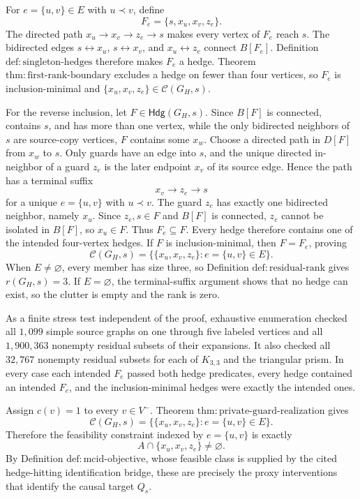 For \(e=\{u,v\}\in E\) with \(u\prec v\), define
\[
 F_e=\{s,x_u,x_v,z_e\}.
\]
The directed path \(x_u\to x_v\to z_e\to s\) makes every vertex of
\(F_e\) reach \(s\).  The bidirected edges
\(s\leftrightarrow x_u\), \(s\leftrightarrow x_v\), and
\(x_u\leftrightarrow z_e\) connect \(B[F_e]\).  Definition
\(\mathrm{def{:}singleton\mbox{-}hedges}\) therefore makes \(F_e\) a
hedge.  Theorem \(\mathrm{thm{:}first\mbox{-}rank\mbox{-}boundary}\)
excludes a hedge on fewer than four vertices, so \(F_e\) is
inclusion-minimal and
\(\{x_u,x_v,z_e\}\in\mathcal C(G_H,s)\).

For the reverse inclusion, let \(F\in\mathsf{Hdg}(G_H,s)\).  Since
\(B[F]\) is connected, contains \(s\), and has more than one vertex, while
the only bidirected neighbors of \(s\) are source-copy vertices, \(F\)
contains some \(x_w\).  Choose a directed path in \(D[F]\) from \(x_w\)
to \(s\).  Only guards have an edge into \(s\), and the unique directed
in-neighbor of a guard \(z_e\) is the later endpoint \(x_v\) of its source
edge.  Hence the path has a terminal suffix
\[
 x_v\longrightarrow z_e\longrightarrow s
\]
for a unique \(e=\{u,v\}\) with \(u\prec v\).  The guard \(z_e\) has
exactly one bidirected neighbor, namely \(x_u\).  Since \(z_e,s\in F\)
and \(B[F]\) is connected, \(z_e\) cannot be isolated in \(B[F]\), so
\(x_u\in F\).  Thus \(F_e\subseteq F\).  Every hedge therefore contains
one of the intended four-vertex hedges.  If \(F\) is inclusion-minimal,
then \(F=F_e\), proving
\[
 \mathcal C(G_H,s)
 =\bigl\{\{x_u,x_v,z_e\}:e=\{u,v\}\in E\bigr\}.
\]
When \(E\neq\varnothing\), every member has size three, so Definition
\(\mathrm{def{:}residual\mbox{-}rank}\) gives \(r(G_H,s)=3\).  If
\(E=\varnothing\), the terminal-suffix argument shows that no hedge can
exist, so the clutter is empty and the rank is zero.

As a finite stress test independent of the proof, exhaustive enumeration
checked all \(1{,}099\) simple source graphs on one through five labeled
vertices and all \(1{,}900{,}363\) nonempty residual subsets of their
expansions.  It also checked all \(32{,}767\) nonempty residual subsets for
each of \(K_{3,3}\) and the triangular prism.  In every case each intended
\(F_e\) passed both hedge predicates, every hedge contained an intended
\(F_e\), and the inclusion-minimal hedges were exactly the intended ones.

Assign \(c(v)=1\) to every \(v\in V^{-}\).  Theorem
\(\mathrm{thm{:}private\mbox{-}guard\mbox{-}realization}\) gives
\[
 \mathcal C(G_H,s)
 =\bigl\{\{x_u,x_v,z_e\}:e=\{u,v\}\in E\bigr\}.
\]
Therefore the feasibility constraint indexed by \(e=\{u,v\}\) is exactly
\[
 A\cap\{x_u,x_v,z_e\}\neq\varnothing.
\]
By Definition \(\mathrm{def{:}mcid\mbox{-}objective}\), whose feasible
class is supplied by the cited hedge-hitting identification bridge, these
are precisely the proxy interventions that identify the causal target
\(Q_s\).

